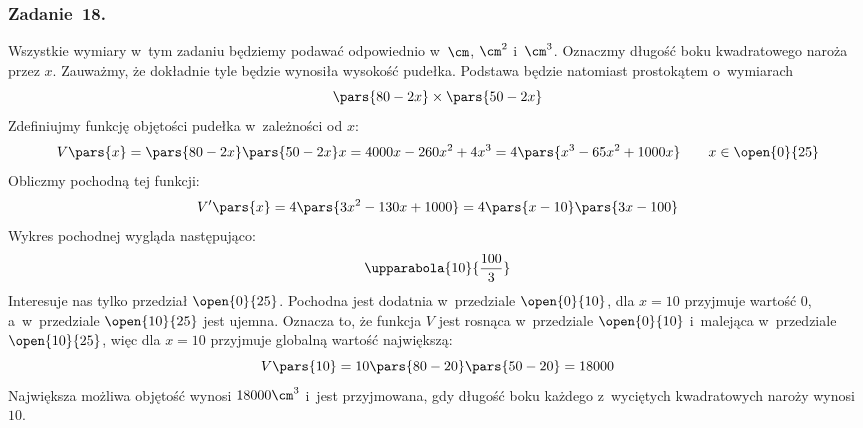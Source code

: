 \subsubsection*{Zadanie~18.}
Wszystkie wymiary w~tym zadaniu będziemy podawać odpowiednio w~\(\cm\), \(\cm^2\) i~\(\cm^3\). Oznaczmy długość boku kwadratowego naroża przez \(x\). Zauważmy, że dokładnie tyle będzie wynosiła wysokość pudełka. Podstawa będzie natomiast prostokątem o~wymiarach
\begin{equation*}
    \pars{80 - 2x} \times \pars{50 - 2x}
\end{equation*}
Zdefiniujmy funkcję objętości pudełka w~zależności od \(x\):
\begin{equation*}
    V\pars{x}
        = \pars{80 - 2x}\pars{50 - 2x}x
        = 4000x - 260x^2 + 4x^3
        = 4\pars{x^3 - 65x^2 + 1000x} \qquad x \in \open{0}{25}
\end{equation*}
Obliczmy pochodną tej funkcji:
\begin{equation*}
    V'\pars{x}
        = 4\pars{3x^2 - 130x + 1000}
        = 4\pars{x - 10}\pars{3x - 100}
\end{equation*}
Wykres pochodnej wygląda następująco:
\begin{equation*}
    \upparabola{10}{\frac{100}{3}}
\end{equation*}
Interesuje nas tylko przedział \(\open{0}{25}\). Pochodna jest dodatnia w~przedziale \(\open{0}{10}\), dla \(x = 10\) przyjmuje wartość \(0\), a~w~przedziale \(\open{10}{25}\) jest ujemna. Oznacza to, że funkcja \(V\) jest rosnąca w~przedziale \(\open{0}{10}\) i~malejąca w~przedziale \(\open{10}{25}\), więc dla \(x = 10\) przyjmuje globalną wartość największą:
\begin{equation*}
    V\pars{10}
        = 10\pars{80 - 20}\pars{50 - 20}
        = 18000
\end{equation*}
Największa możliwa objętość wynosi \(18000\cm^3\) i~jest przyjmowana, gdy długość boku każdego z~wyciętych kwadratowych naroży wynosi \(10\).

